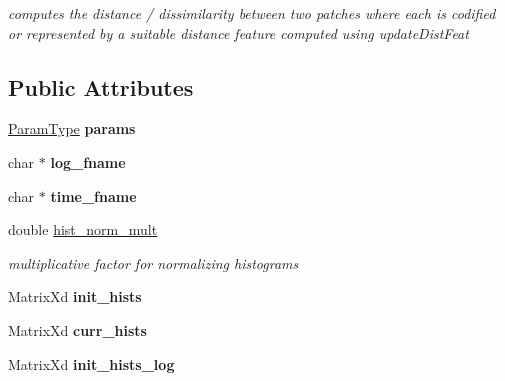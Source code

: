 \begin{DoxyCompactItemize}
\begin{DoxyCompactList}\small\item\em computes the distance / dissimilarity between two patches where each is codified or represented by a suitable distance feature computed using update\-Dist\-Feat \end{DoxyCompactList}\end{DoxyCompactItemize}
\subsection*{Public Attributes}
\begin{DoxyCompactItemize}
\item 
\hypertarget{classLKLD_ab0b0ca06068f07f46654222e41bdb1d0}{\hyperlink{structLKLDParams}{Param\-Type} {\bfseries params}}\label{classLKLD_ab0b0ca06068f07f46654222e41bdb1d0}

\item 
\hypertarget{classLKLD_a250734fa6c1a19c964ff64a20493c71f}{char $\ast$ {\bfseries log\-\_\-fname}}\label{classLKLD_a250734fa6c1a19c964ff64a20493c71f}

\item 
\hypertarget{classLKLD_a30839150473ec564f405619f236190cc}{char $\ast$ {\bfseries time\-\_\-fname}}\label{classLKLD_a30839150473ec564f405619f236190cc}

\item 
\hypertarget{classLKLD_ad90f22c1a9934dddb822fa2c711a0278}{double \hyperlink{classLKLD_ad90f22c1a9934dddb822fa2c711a0278}{hist\-\_\-norm\-\_\-mult}}\label{classLKLD_ad90f22c1a9934dddb822fa2c711a0278}

\begin{DoxyCompactList}\small\item\em multiplicative factor for normalizing histograms \end{DoxyCompactList}\item 
\hypertarget{classLKLD_a33e2012e6f9dc6c81d1c8c101e872922}{Matrix\-Xd {\bfseries init\-\_\-hists}}\label{classLKLD_a33e2012e6f9dc6c81d1c8c101e872922}

\item 
\hypertarget{classLKLD_a39e25a256ffecfe193d499d0ad110777}{Matrix\-Xd {\bfseries curr\-\_\-hists}}\label{classLKLD_a39e25a256ffecfe193d499d0ad110777}

\item 
\hypertarget{classLKLD_aa9932365cab56df0d391f931914b010e}{Matrix\-Xd {\bfseries init\-\_\-hists\-\_\-log}}\label{classLKLD_aa9932365cab56df0d391f931914b010e}


\end{DoxyCompactItemize}
